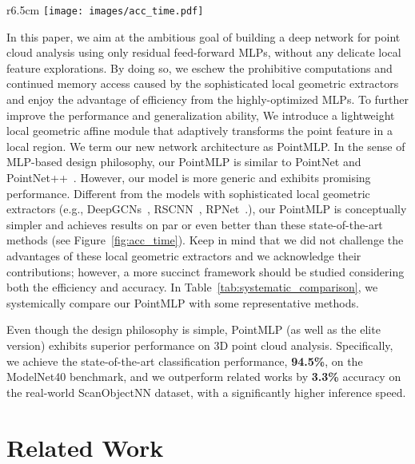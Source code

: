 \begin{wrapfigure}{r}{6.5cm}
    \centering
    \vspace{-2mm}
    \texttt{[image: images/acc\_time.pdf]}
    \vspace{-6mm}
    \caption{Accuracy-speed tradeoff on ModelNet40. Our PointMLP performs best. Please refer to Section~\ref{sec:experiments} for details.}
    \vspace{-2mm}
    \label{fig:acc_time}
\end{wrapfigure}
In this paper, we aim at the ambitious goal of building a deep network for point cloud analysis using only residual feed-forward MLPs, without any delicate local feature explorations. By doing so, we eschew the prohibitive computations and continued memory access caused by the sophisticated local geometric extractors and enjoy the advantage of efficiency from the highly-optimized MLPs. To further improve the performance and generalization ability,
We introduce a lightweight local geometric affine module that adaptively transforms the point feature in a local region. We term our new network architecture as PointMLP. In the sense of MLP-based design philosophy, our PointMLP is similar to PointNet and PointNet++~\citep{qi2017pointnet, qi2017pointnet++}. However, our model is more generic and exhibits promising performance. Different from the models with sophisticated local geometric extractors (e.g., DeepGCNs~\citep{li2019deepgcns}, RSCNN~\citep{liu2019relation}, RPNet~\citep{ran2021learning}.), our PointMLP is conceptually simpler and achieves results on par or even better than these state-of-the-art methods (see Figure~\ref{fig:acc_time}). Keep in mind that we did not challenge the advantages of these local geometric extractors and we acknowledge their contributions; however, a more succinct framework should be studied considering both the efficiency and accuracy.
In Table~\ref{tab:systematic_comparison}, we systemically compare our PointMLP with some representative methods.

Even though the design philosophy is simple, PointMLP (as well as the elite version) exhibits superior performance on 3D point cloud analysis. Specifically, we achieve the state-of-the-art classification performance, \textbf{94.5\%}, on the ModelNet40 benchmark, and we outperform related works by \textbf{3.3\%} accuracy on the real-world ScanObjectNN dataset, with a significantly higher inference speed.

\section{Related Work}
\label{sec:related_work}

